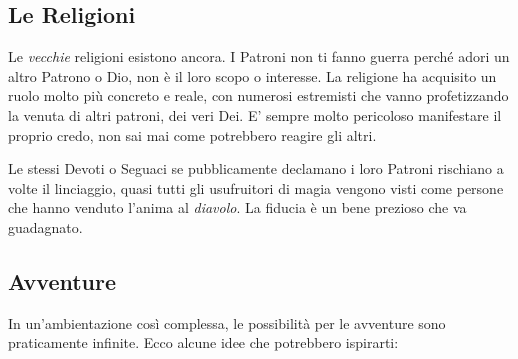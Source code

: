 \begin{multicols}{2}
\subsection{Le Religioni}

Le \emph{vecchie} religioni esistono ancora. I Patroni non ti fanno guerra perché adori un altro Patrono o Dio, non è il loro scopo o interesse. La religione ha acquisito un ruolo molto più concreto e reale, con numerosi estremisti che vanno profetizzando la venuta di altri patroni, dei veri Dei. E' sempre molto pericoloso manifestare il proprio credo, non sai mai come potrebbero reagire gli altri.

Le stessi Devoti o Seguaci se pubblicamente declamano i loro Patroni rischiano a volte il linciaggio, quasi tutti gli usufruitori di magia vengono visti come persone che hanno venduto l'anima al \emph{diavolo}. La fiducia è un bene prezioso che va guadagnato.

\subsection{Avventure}\label{avventure}

In un'ambientazione così complessa, le possibilità per le avventure sono praticamente infinite. Ecco alcune idee che potrebbero ispirarti:


\end{multicols}
